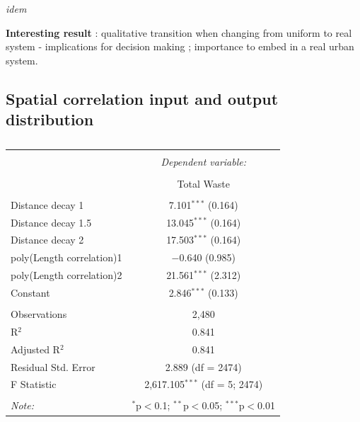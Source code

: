 \documentclass[fleqn,10pt]{wlscirep}
\begin{document}
{\textit{idem}

\textbf{Interesting result} : qualitative transition when changing from uniform to real system - implications for decision making ; importance to embed in a real urban system.



\subsection*{Spatial correlation input and output distribution}
\begin{table}[!htbp] \centering 
  \caption{} 
  \label{} 
\begin{tabular}{@{\extracolsep{5pt}}lc} 
\\[-1.8ex]\hline 
\hline \\[-1.8ex] 
 & \multicolumn{1}{c}{\textit{Dependent variable:}} \\ 
\cline{2-2} 
\\[-1.8ex] & Total Waste \\ 
\hline \\[-1.8ex] 
 Distance decay 1 & 7.101$^{***}$ (0.164) \\ 
 Distance decay 1.5 & 13.045$^{***}$ (0.164) \\ 
 Distance decay 2 & 17.503$^{***}$ (0.164) \\ 
 poly(Length correlation)1 & $-$0.640 (0.985) \\ 
 poly(Length correlation)2 & 21.561$^{***}$ (2.312) \\ 
 Constant & 2.846$^{***}$ (0.133) \\ 
\hline \\[-1.8ex] 
Observations & 2,480 \\ 
R$^{2}$ & 0.841 \\ 
Adjusted R$^{2}$ & 0.841 \\ 
Residual Std. Error & 2.889 (df = 2474) \\ 
F Statistic & 2,617.105$^{***}$ (df = 5; 2474) \\ 
\hline 
\hline \\[-1.8ex] 
\textit{Note:}  & \multicolumn{1}{r}{$^{*}$p$<$0.1; $^{**}$p$<$0.05; $^{***}$p$<$0.01} \\ 
\end{tabular} 
\end{table} 

}
\end{document}
